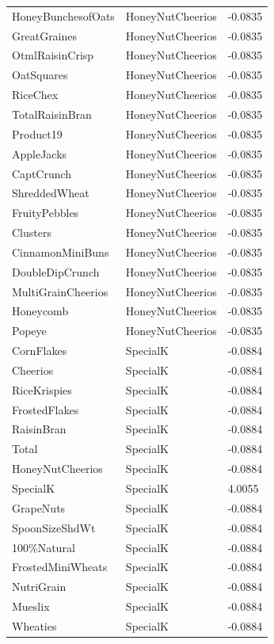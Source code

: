 \begin{table}[!htbp]
\begin{tabular}{lll}
\\
HoneyBunchesofOats & HoneyNutCheerios & -0.0835
\\
GreatGraines & HoneyNutCheerios & -0.0835
\\
OtmlRaisinCrisp & HoneyNutCheerios & -0.0835
\\
OatSquares & HoneyNutCheerios & -0.0835
\\
RiceChex & HoneyNutCheerios & -0.0835
\\
TotalRaisinBran & HoneyNutCheerios & -0.0835
\\
Product19 & HoneyNutCheerios & -0.0835
\\
AppleJacks & HoneyNutCheerios & -0.0835
\\
CaptCrunch & HoneyNutCheerios & -0.0835
\\
ShreddedWheat & HoneyNutCheerios & -0.0835
\\
FruityPebbles & HoneyNutCheerios & -0.0835
\\
Clusters & HoneyNutCheerios & -0.0835
\\
CinnamonMiniBuns & HoneyNutCheerios & -0.0835
\\
DoubleDipCrunch & HoneyNutCheerios & -0.0835
\\
MultiGrainCheerios & HoneyNutCheerios & -0.0835
\\
Honeycomb & HoneyNutCheerios & -0.0835
\\
Popeye & HoneyNutCheerios & -0.0835
\\
CornFlakes & SpecialK & -0.0884
\\
Cheerios & SpecialK & -0.0884
\\
RiceKrispies & SpecialK & -0.0884
\\
FrostedFlakes & SpecialK & -0.0884
\\
RaisinBran & SpecialK & -0.0884
\\
Total & SpecialK & -0.0884
\\
HoneyNutCheerios & SpecialK & -0.0884
\\
SpecialK & SpecialK & 4.0055
\\
GrapeNuts & SpecialK & -0.0884
\\
SpoonSizeShdWt & SpecialK & -0.0884
\\
100\%Natural & SpecialK & -0.0884
\\
FrostedMiniWheats & SpecialK & -0.0884
\\
NutriGrain & SpecialK & -0.0884
\\
Mueslix & SpecialK & -0.0884
\\
Wheaties & SpecialK & -0.0884
\\

\end{tabular}
\end{table}
